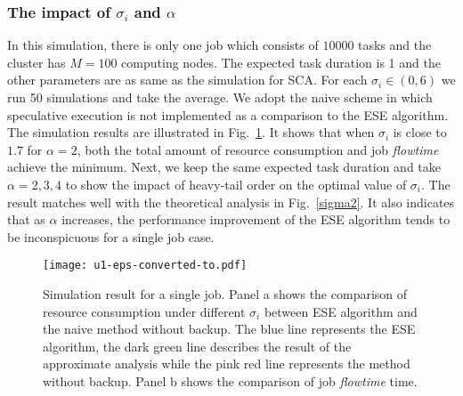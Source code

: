 \documentclass[10pt,conference]{IEEEtran}
\begin{document}
\vspace{0.2em}
\subsubsection{The impact of $\sigma_i$ and $\alpha$}
In this simulation, there is only one job which consists of $10000$ tasks and the cluster has $M = 100$ computing nodes. The expected task duration is 1 and the other parameters are as same as the simulation for SCA. For each $\sigma_i \in (0,6)$ we run 50 simulations and take the average. We adopt the naive scheme in which speculative execution is not implemented as a comparison to the ESE algorithm. The simulation results are illustrated in Fig.~\ref{single}. It shows that when $\sigma_i$ is close to $1.7$ for $\alpha = 2$, both the total amount of resource consumption and job \textit{flowtime} achieve the minimum. Next, we keep the same expected task duration and take $\alpha = 2, 3, 4$ to show the impact of heavy-tail order on the optimal value of $\sigma_i$.  The result matches well with the theoretical analysis in Fig.~\ref{sigma2}. It also indicates that as $\alpha$ increases, the performance improvement of the ESE algorithm tends to be inconspicuous for a single job case.
\begin{figure}
\centering
\texttt{[image: u1-eps-converted-to.pdf]}
\caption{Simulation result for a single job. Panel a shows the comparison of resource consumption under different $\sigma_i$ between ESE algorithm and the naive method without backup. The blue line represents the ESE algorithm, the dark green line describes the result of the approximate analysis while the pink red line represents the method without backup. Panel b shows the comparison of job \textit{flowtime} time. }
\label{single}
\vspace{-0.3 cm}
\end{figure}
\end{document}

